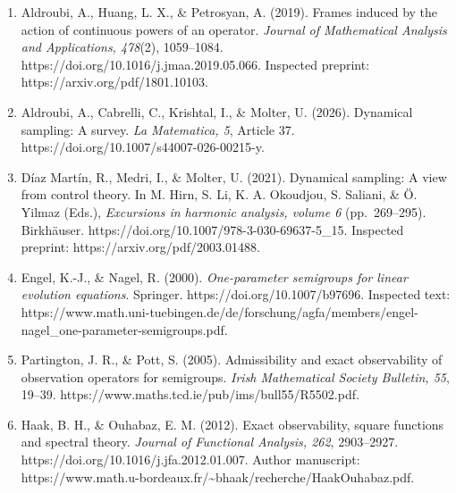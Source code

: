 \documentclass[
  11pt,
]{article}
\begin{document}
\begin{enumerate}
\def\labelenumi{\arabic{enumi}.}
\item
  Aldroubi, A., Huang, L. X., \& Petrosyan, A. (2019). Frames induced by
  the action of continuous powers of an operator. \emph{Journal of
  Mathematical Analysis and Applications, 478}(2), 1059--1084.
  https://doi.org/10.1016/j.jmaa.2019.05.066. Inspected preprint:
  https://arxiv.org/pdf/1801.10103.
\item
  Aldroubi, A., Cabrelli, C., Krishtal, I., \& Molter, U. (2026).
  Dynamical sampling: A survey. \emph{La Matematica, 5}, Article 37.
  https://doi.org/10.1007/s44007-026-00215-y.
\item
  Díaz Martín, R., Medri, I., \& Molter, U. (2021). Dynamical sampling:
  A view from control theory. In M. Hirn, S. Li, K. A. Okoudjou, S.
  Saliani, \& Ö. Yilmaz (Eds.), \emph{Excursions in harmonic analysis,
  volume 6} (pp.~269--295). Birkhäuser.
  https://doi.org/10.1007/978-3-030-69637-5\_15. Inspected preprint:
  https://arxiv.org/pdf/2003.01488.
\item
  Engel, K.-J., \& Nagel, R. (2000). \emph{One-parameter semigroups for
  linear evolution equations}. Springer. https://doi.org/10.1007/b97696.
  Inspected text:
  https://www.math.uni-tuebingen.de/de/forschung/agfa/members/engel-nagel\_one-parameter-semigroups.pdf.
\item
  Partington, J. R., \& Pott, S. (2005). Admissibility and exact
  observability of observation operators for semigroups. \emph{Irish
  Mathematical Society Bulletin, 55}, 19--39.
  https://www.maths.tcd.ie/pub/ims/bull55/R5502.pdf.
\item
  Haak, B. H., \& Ouhabaz, E. M. (2012). Exact observability, square
  functions and spectral theory. \emph{Journal of Functional Analysis,
  262}, 2903--2927. https://doi.org/10.1016/j.jfa.2012.01.007. Author
  manuscript:
  https://www.math.u-bordeaux.fr/\textasciitilde bhaak/recherche/HaakOuhabaz.pdf.
\end{enumerate}
\end{document}

